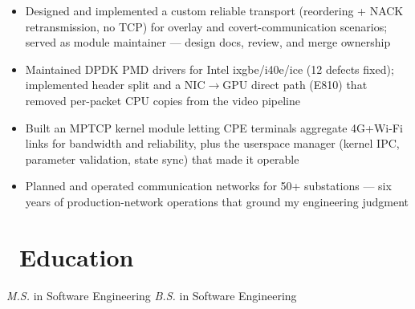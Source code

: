 \documentclass{resume}
\begin{document}
\begin{onehalfspacing}
\begin{itemize}
	\item Designed and implemented a custom reliable transport (reordering + NACK retransmission, no TCP) for overlay and covert-communication scenarios; served as module maintainer --- design docs, review, and merge ownership
\end{itemize}
\end{onehalfspacing}

\begin{onehalfspacing}
\begin{itemize}
	\item Maintained DPDK PMD drivers for Intel ixgbe/i40e/ice (12 defects fixed); implemented header split and a NIC$\to$GPU direct path (E810) that removed per-packet CPU copies from the video pipeline
\end{itemize}
\end{onehalfspacing}

\begin{onehalfspacing}
\begin{itemize}
	\item Built an MPTCP kernel module letting CPE terminals aggregate 4G+Wi-Fi links for bandwidth and reliability, plus the userspace manager (kernel IPC, parameter validation, state sync) that made it operable
\end{itemize}
\end{onehalfspacing}

\begin{onehalfspacing}
\begin{itemize}
	\item Planned and operated communication networks for 50+ substations --- six years of production-network operations that ground my engineering judgment
\end{itemize}
\end{onehalfspacing}

\section{\faGraduationCap\ Education}
\textit{M.S.} in Software Engineering
\textit{B.S.} in Software Engineering
\end{document}
